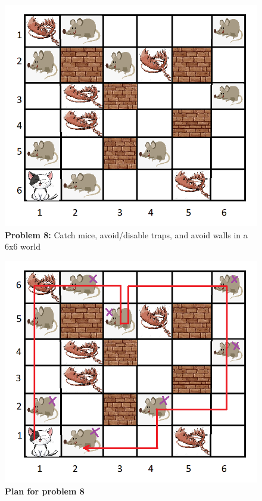 \begin{minipage}{\textwidth}
\begin{multicols}{2}

\begin{figure}[H]
    \centering
    \includegraphics[width=\linewidth]{fig/A3/cat_08.png}
    \caption{\textbf{Problem 8:} Catch mice, avoid/disable traps, and avoid walls in a 6x6 world}
    \label{fig:cat_08}
\end{figure}

\columnbreak

\begin{figure}[H]
    \centering
    \includegraphics[width=\linewidth]{fig/A3/cat_08_sol.png}
    \caption{\textbf{Plan for problem 8}}
    \label{fig:cat_08_sol}
\end{figure}

\end{multicols}
\smallskip
\end{minipage}

